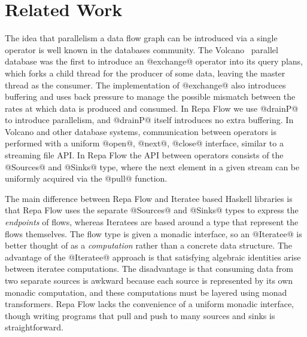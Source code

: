 \section{Related Work}

The idea that parallelism a data flow graph can be introduced via a single operator is well known in the databases community. The Volcano~\cite{Graefe:Volcano} parallel database was the first to introduce an @exchange@ operator into its query plans, which forks a child thread for the producer of some data, leaving the master thread as the consumer. The implementation of @exchange@ also introduces buffering and uses back pressure to manage the possible mismatch between the rates at which data is produced and consumed. In Repa Flow we use @drainP@ to introduce parallelism, and @drainP@ itself introduces no extra buffering. In Volcano and other database systems, communication between operators is performed with a uniform @open@, @next@, @close@ interface, similar to a streaming file API. In Repa Flow the API between operators consists of the @Sources@ and @Sinks@ type, where the next element in a given stream can be uniformly acquired via the @pull@ function.

The main difference between Repa Flow and Iteratee based Haskell libraries 
\cite{Kiselyov:iteratee, hackage:enumerator, hackage:conduit, hackage:pipes} is that Repa Flow uses the separate @Sources@ and @Sinks@ types to express the \emph{endpoints} of flows, whereas Iteratees are based around a type that represent the flows themselves. The flow type is given a monadic interface, so an @Iteratee@ is better thought of as a \emph{computation} rather than a concrete data structure. The advantage of the @Iteratee@ approach is that satisfying algebraic identities arise between iteratee computations. The disadvantage is that consuming data from two separate sources is awkward because each source is represented by its own monadic computation, and these computations must be layered using monad transformers. Repa Flow lacks the convenience of a uniform monadic interface, though writing programs that pull and push to many sources and sinks is straightforward.

